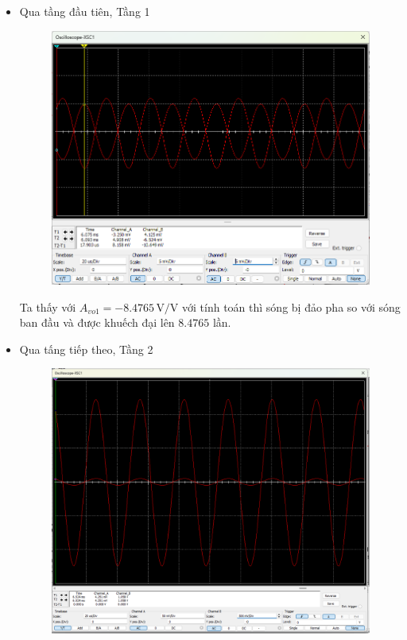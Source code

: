 \begin{itemize}[label=-]
	\item Qua tầng đầu tiên, Tầng 1
	
	\begin{figure}[H]
		\centering
		\includegraphics[width=.8\linewidth]{./my-chapters/my-images/Question6/c_stage_1.png}
	\end{figure}
	
	Ta thấy với $A_{vo1} = -8.4765\,\text{V/V}$ với tính toán thì sóng bị đảo pha so với sóng ban đầu và được khuếch đại lên $8.4765$ lần.
	
	\item Qua tấng tiếp theo, Tầng 2
	
	\begin{figure}[H]
		\centering
		\includegraphics[width=.8\linewidth]{./my-chapters/my-images/Question6/c_stage_2.png}
	\end{figure}
	

\end{itemize}
